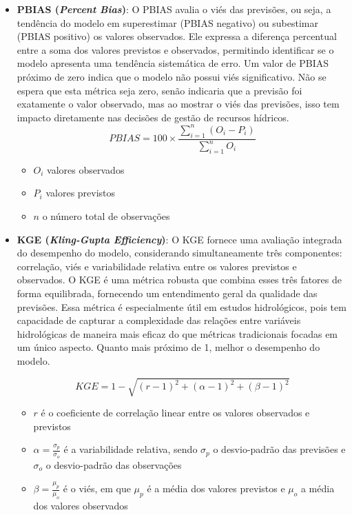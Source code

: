 \begin{itemize}
\item \textbf{PBIAS (\textit{Percent Bias})}: O PBIAS avalia o viés das previsões, ou seja, a tendência do modelo em superestimar (PBIAS negativo) ou subestimar (PBIAS positivo) os valores observados. Ele expressa a diferença percentual entre a soma dos valores previstos e observados, permitindo identificar se o modelo apresenta uma tendência sistemática de erro. Um valor de PBIAS próximo de zero indica que o modelo não possui viés significativo. Não se espera que esta métrica seja zero, senão indicaria que a previsão foi exatamente o valor observado, mas ao mostrar o viés das previsões, isso tem impacto diretamente nas decisões de gestão de recursos hídricos.
\begin{equation}
PBIAS = 100 \times \frac{\sum_{i=1}^{n} (O_i - P_i)}{\sum_{i=1}^{n} O_i}
\end{equation}
\begin{itemize}
	\item $O_i$ valores observados
	\item $P_i$ valores previstos
	\item $n$ o número total de observações
\end{itemize}

\item \textbf{KGE (\textit{Kling-Gupta Efficiency})}: O KGE fornece uma avaliação integrada do desempenho do modelo, considerando simultaneamente três componentes: correlação, viés e variabilidade relativa entre os valores previstos e observados. O KGE é uma métrica robusta que combina esses três fatores de forma equilibrada, fornecendo um entendimento geral da qualidade das previsões. Essa métrica é especialmente útil em estudos hidrológicos, pois tem capacidade de capturar a complexidade das relações entre variáveis hidrológicas de maneira mais eficaz do que métricas tradicionais focadas em um único aspecto. Quanto mais próximo de 1, melhor o desempenho do modelo.\cite{Gupta2009}

\begin{equation}
KGE = 1 - \sqrt{(r - 1)^2 + (\alpha - 1)^2 + (\beta - 1)^2}
\end{equation}
\begin{itemize}
	\item $r$ é o coeficiente de correlação linear entre os valores observados e previstos 
	\item $\alpha = \frac{\sigma_p}{\sigma_o}$ é a variabilidade relativa, sendo $\sigma_p$ o desvio-padrão das previsões e $\sigma_o$ o desvio-padrão das observações
	\item $\beta = \frac{\mu_p}{\mu_o}$ é o viés, em que $\mu_p$ é a média dos valores previstos e $\mu_o$ a média dos valores observados		
\end{itemize}

\end{itemize}

